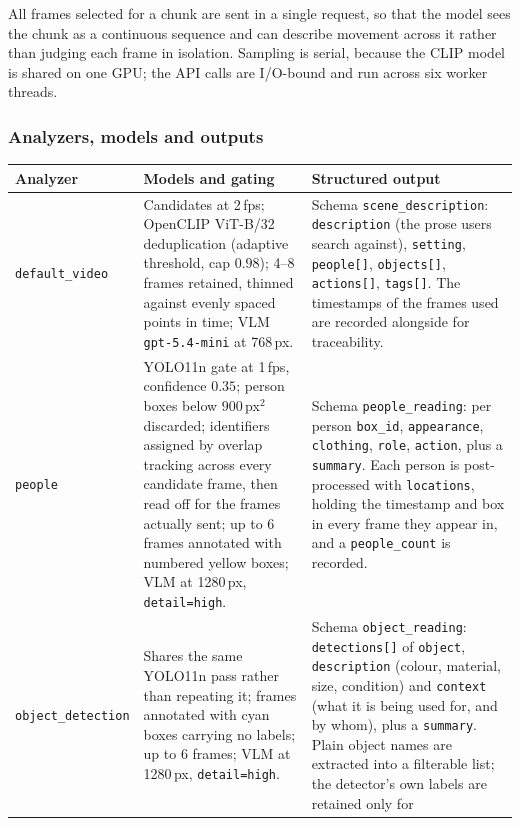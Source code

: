 All frames selected for a chunk are sent in a single request, so that the model sees
the chunk as a continuous sequence and can describe movement across it rather than
judging each frame in isolation. Sampling is serial, because the CLIP model is shared
on one GPU; the API calls are I/O-bound and run across six worker threads.

\subsubsection*{Analyzers, models and outputs}

\begin{table}[htbp]
\centering
\small
\begin{tabularx}{\textwidth}{@{}L{2.2cm}L{3.5cm}X@{}}
\toprule
\textbf{Analyzer} & \textbf{Models and gating} & \textbf{Structured output} \\
\midrule
\texttt{default\_video} &
Candidates at 2\,fps; OpenCLIP ViT-B/32 deduplication (adaptive threshold, cap $0.98$);
4--8 frames retained, thinned against evenly spaced points in time; VLM
\texttt{gpt-5.4-mini} at 768\,px. &
Schema \texttt{scene\_description}: \texttt{description} (the prose users search
against), \texttt{setting}, \texttt{people[]}, \texttt{objects[]}, \texttt{actions[]},
\texttt{tags[]}. The timestamps of the frames used are recorded alongside for
traceability. \\
\texttt{people} &
YOLO11n gate at 1\,fps, confidence $0.35$; person boxes below $900$\,px$^2$ discarded;
identifiers assigned by overlap tracking across every candidate frame, then read
off for the frames actually sent; up to 6 frames annotated with numbered yellow boxes;
VLM at 1280\,px, \texttt{detail=high}. &
Schema \texttt{people\_reading}: per person \texttt{box\_id}, \texttt{appearance},
\texttt{clothing}, \texttt{role}, \texttt{action}, plus a \texttt{summary}. Each person
is post-processed with \texttt{locations}, holding the timestamp and box in every frame
they appear in, and a \texttt{people\_count} is recorded. \\
\texttt{object\_\allowbreak detection} &
Shares the same YOLO11n pass rather than repeating it; frames annotated with cyan
boxes carrying no labels; up to 6 frames; VLM at 1280\,px, \texttt{detail=high}. &
Schema \texttt{object\_reading}: \texttt{detections[]} of \texttt{object},
\texttt{description} (colour, material, size, condition) and \texttt{context} (what it
is being used for, and by whom), plus a \texttt{summary}. Plain object names are
extracted into a filterable list; the detector's own labels are retained only for

\end{tabularx}
\end{table}
